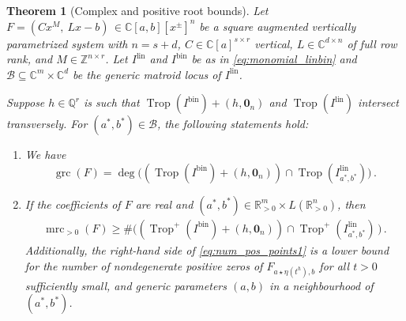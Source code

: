 \documentclass[11pt,reqno,a4paper]{amsart}
\numberwithin{equation}{section}
\theoremstyle{theoremstyle}
\newtheorem{theorem}{Theorem}[section]
\theoremstyle{examplestyle}
\newcommand{\CC}{\mathbb{C}}
\newcommand{\RR}{\mathbb{R}}
\newcommand{\QQ}{\mathbb{Q}}
\newcommand{\lin}{{\mathrm{lin}}}
\newcommand{\bin}{{\mathrm{bin}}}
\DeclareMathOperator{\grc}{grc}
\DeclareMathOperator{\mrc}{mrc}
\DeclareMathOperator{\Trop}{Trop}
\begin{document}
\begin{theorem}[Complex and positive root bounds]
\label{thm:monomial_reembedding_bounds}
Let $F=(C x^M ,\: L x - b)\, \in \CC[a,b][x^\pm]^n$ be a square augmented vertically parametrized system
with   $n=s+d$, $C\in \CC[a]^{s\times r}$ vertical, 
$L\in \mathbb{C}^{d\times n}$ of full row rank, and  $M\in \mathbb{Z}^{n\times r}$. 
Let $I^{\lin}$ and $I^{\bin}$ be as in \eqref{eq:monomial_linbin} and $\mathcal{B}\subseteq \CC^m\times\CC^d$ be the  generic matroid locus of $I^{\lin}$.  

Suppose $h\in\QQ^r$ is such that
$\Trop(I^{\bin})+(h,\mathbf{0}_n)$ and $\Trop(I^{\lin})$ intersect transversely. 
For  $(a^*,b^*)\in\mathcal{B}$, the following statements hold:
\begin{enumerate}[label=(\roman*)]
    \item We have
    \[\grc(F)=\deg\big((\Trop(I^{\bin})+(h,\mathbf{0}_{n} )) \cap \Trop(I^{\lin}_{a^*,b^*})\big)\, .\]

   \item 
  If the coefficients of $F$ are real
    and 
    $(a^*,b^*)\in\RR^m_{>0}\times L(\RR^n_{>0})$, then 
    \begin{align}
\label{eq:num_pos_points1} 
    \mrc_{>0}(F)\geq\#\big( (\Trop^+(I^{\bin})+(h,\mathbf{0}_{n} ))\cap \Trop^+(I_{a^*,b^*}^{\lin})\,\big) \, . 
    \end{align}
   Additionally, the right-hand side of \eqref{eq:num_pos_points1} is a lower bound for the number of nondegenerate positive zeros of  $F_{a\star \eta(t^h),b}$ for all $t>0$ sufficiently small, and generic parameters $(a,b)$ in a  neighbourhood of $(a^*,b^*)$.  
\end{enumerate}
\end{theorem}
\end{document}
